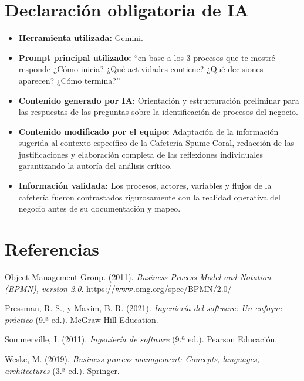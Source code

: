 \documentclass[12pt,letterpaper]{article}
\begin{document}
\section{Declaración obligatoria de IA}

\begin{itemize}
    \item \textbf{Herramienta utilizada:} Gemini.
    \item \textbf{Prompt principal utilizado:} ``en base a los 3 procesos que te mostré responde ¿Cómo inicia? ¿Qué actividades contiene? ¿Qué decisiones aparecen? ¿Cómo termina?''
    \item \textbf{Contenido generado por IA:} Orientación y estructuración preliminar para las respuestas de las preguntas sobre la identificación de procesos del negocio.
    \item \textbf{Contenido modificado por el equipo:} Adaptación de la información sugerida al contexto específico de la Cafetería Spume Coral, redacción de las justificaciones y elaboración completa de las reflexiones individuales garantizando la autoría del análisis crítico.
    \item \textbf{Información validada:} Los procesos, actores, variables y flujos de la cafetería fueron contrastados rigurosamente con la realidad operativa del negocio antes de su documentación y mapeo.
\end{itemize}

\section*{Referencias}

\begin{list}{}{\setlength{\leftmargin}{1.25cm}\setlength{\itemindent}{-1.25cm}\setlength{\itemsep}{6pt}\setlength{\parsep}{0pt}}
\item Object Management Group. (2011). \textit{Business Process Model and Notation (BPMN), version 2.0}. https://www.omg.org/spec/BPMN/2.0/
\item Pressman, R. S., y Maxim, B. R. (2021). \textit{Ingeniería del software: Un enfoque práctico} (9.ª ed.). McGraw-Hill Education.
\item Sommerville, I. (2011). \textit{Ingeniería de software} (9.ª ed.). Pearson Educación.
\item Weske, M. (2019). \textit{Business process management: Concepts, languages, architectures} (3.ª ed.). Springer.
\end{list}
\end{document}
